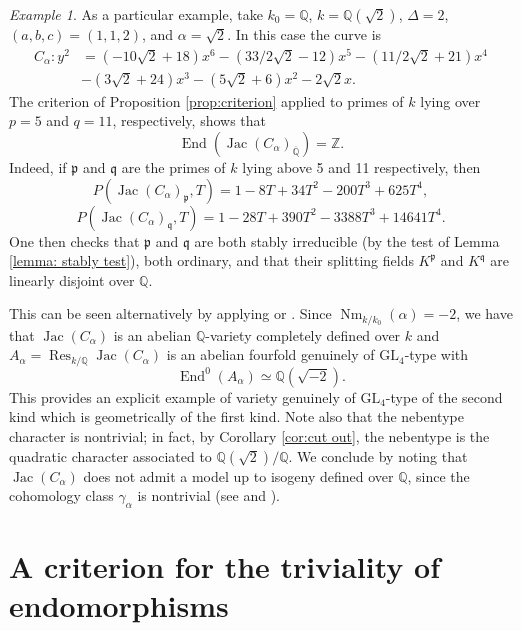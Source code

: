 \documentclass[oneside]{amsart}
\theoremstyle{remark}
\newtheorem{example}[theorem]{Example}
\newcommand{\on}{\operatorname }
\newcommand{\Q}{\mathbb Q}
\newcommand{\Qbar}{{\overline{\mathbb Q}}}
\newcommand{\Z}{\mathbb Z}
\newcommand{\GL}{\mathrm{GL}}
\newcommand{\End}{\operatorname{End}}
\newcommand{\Jac}{\operatorname{Jac}}
\newcommand{\p}{\mathfrak{p}}
\newcommand{\Res}{\operatorname{Res}}
\newcommand{\fq}{\mathfrak{q}}
\numberwithin{equation}{section}
\begin{document}
\begin{example}\label{ex:curve}
  As a particular example, take $k_0=\Q$, $k=\Q(\sqrt{2})$, $\Delta = 2$,  $(a,b,c)=(1,1,2)$, and $\alpha = \sqrt{2}$. In this case the curve is
  \begin{align*}
    C_\alpha\colon y^2 &= (-10{\sqrt{2}} + 18)x^6 - (33/2{\sqrt{2}} - 12)x^5 - (11/2{\sqrt{2}} + 21)x^4\\ &- (3{\sqrt{2}} + 24)x^3 - (5{\sqrt{2}} + 6)x^2 - 2{\sqrt{2}}x.
  \end{align*}
  The criterion of Proposition \ref{prop:criterion} applied to  primes of $k$ lying over $p=5$ and $q=11$, respectively, shows that
  \[
    \End(\Jac(C_\alpha)_\Qbar)=\Z.
  \]
  Indeed, if $\p$ and $\fq$ are the primes of $k$ lying above 5 and 11 respectively, then
  \begin{equation*}
    P(\Jac(C_\alpha)_\p,T) =  1 - 8T + 34T^2 - 200T^3 + 625T^4, 
  \end{equation*}
  \begin{equation*}
    P(\Jac(C_\alpha)_\fq,T) = 1 - 28T + 390T^2 - 3388T^3 + 14641T^4.
  \end{equation*}
One then checks that $\p$ and $\fq$ are both stably irreducible (by the test of Lemma \ref{lemma: stably test}), both ordinary, and that their splitting fields $K^\p$ and $K^\fq$  are linearly disjoint over $\Q$.
  
This can be seen alternatively by applying \cite{CMSV19} or \cite{Lom19}. Since $\on{Nm}_{k/k_0}(\alpha)=-2$, we have that $\Jac(C_\alpha)$ is an abelian $\Q$-variety completely defined over $k$ and $A_\alpha=\Res_{k/\Q}\Jac(C_\alpha)$ is an abelian fourfold genuinely of $\GL_4$-type with
  \[
    \End^0(A_\alpha)\simeq \Q(\sqrt{-2}).
  \]
This provides an explicit example of variety genuinely of $\GL_4$-type of the second kind which is geometrically of the first kind. Note also that the nebentype character is nontrivial; in fact, by Corollary \ref{cor:cut out}, the nebentype is the quadratic character associated to $\Q(\sqrt{2})/\Q$. We conclude by noting that $\Jac(C_\alpha)$ does not admit a model up to isogeny defined over $\Q$, since the cohomology class $\gamma_\alpha$ is nontrivial (see \cite[\S8]{Rib92} and \cite[\S5]{Pyl04}).
  
\end{example}


\section{A criterion for the triviality of endomorphisms}\label{section: criterion}
\end{document}
